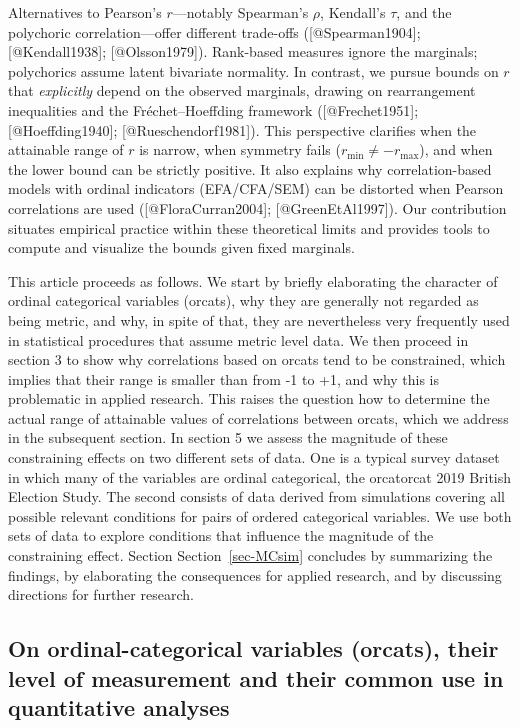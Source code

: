 \documentclass[
  12pt,
]{article}
\theoremstyle{plain}
\theoremstyle{definition}
\theoremstyle{remark}
\begin{document}
Alternatives to Pearson’s \(r\)—notably Spearman’s \(\rho\), Kendall’s \(\tau\), and the polychoric correlation—offer different trade-offs ([@Spearman1904]; [@Kendall1938]; [@Olsson1979]). Rank-based measures ignore the marginals; polychorics assume latent bivariate normality. In contrast, we pursue bounds on \(r\) that \emph{explicitly} depend on the observed marginals, drawing on rearrangement inequalities and the Fréchet–Hoeffding framework ([@Frechet1951]; [@Hoeffding1940]; [@Rueschendorf1981]). This perspective clarifies when the attainable range of \(r\) is narrow, when symmetry fails (\(r_{\min}\neq -r_{\max}\)), and when the lower bound can be strictly positive. It also explains why correlation-based models with ordinal indicators (EFA/CFA/SEM) can be distorted when Pearson correlations are used ([@FloraCurran2004]; [@GreenEtAl1997]). Our contribution situates empirical practice within these theoretical limits and provides tools to compute and visualize the bounds given fixed marginals.

This article proceeds as follows. We start by briefly elaborating the
character of ordinal categorical variables (orcats), why they are
generally not regarded as being metric, and why, in spite of that, they
are nevertheless very frequently used in statistical procedures that
assume metric level data. We then proceed in section 3 to show why
correlations based on orcats tend to be constrained, which implies that
their range is smaller than from -1 to +1, and why this is problematic
in applied research. This raises the question how to determine the
actual range of attainable values of correlations between orcats, which
we address in the subsequent section. In section 5 we assess the
magnitude of these constraining effects on two different sets of data.
One is a typical survey dataset in which many of the variables are
ordinal categorical, the orcatorcat 2019 British Election Study. The
second consists of data derived from simulations covering all possible
relevant conditions for pairs of ordered categorical variables. We use
both sets of data to explore conditions that influence the magnitude of
the constraining effect. Section Section~\ref{sec-MCsim} concludes by
summarizing the findings, by elaborating the consequences for applied
research, and by discussing directions for further research.

\subsection{On ordinal-categorical variables (orcats), their level of
measurement and their common use in quantitative
analyses}\label{on-ordinal-categorical-variables-orcats-their-level-of-measurement-and-their-common-use-in-quantitative-analyses}
\end{document}
